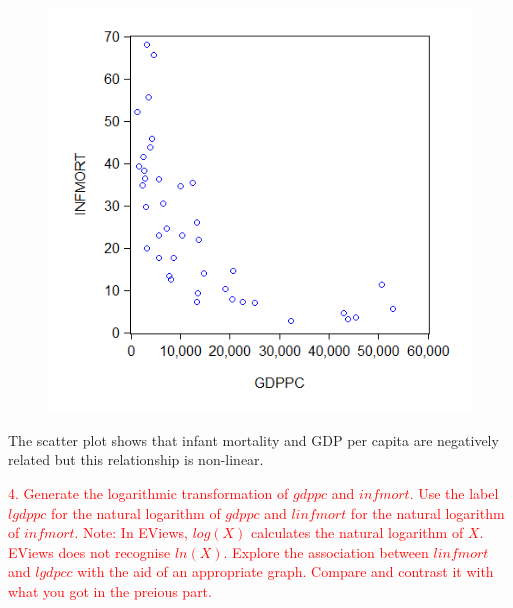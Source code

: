 \documentclass[12pt]{report}
\begin{document}
\vspace{-\baselineskip}	
\begin{figure}[H]
	\centerline{\includegraphics{2018sem2_q1_7}}
\end{figure}
\vspace{-\baselineskip}	\noindent The scatter plot shows that infant mortality and GDP per capita are negatively related but this relationship is non-linear.

\noindent \textcolor{red}{4. Generate the logarithmic transformation of $gdppc$ and $infmort$. Use the label $lgdppc$ for the natural logarithm of $gdppc$ and $linfmort$ for the natural logarithm of $infmort$. Note: In EViews, $log(X)$ calculates the natural logarithm of $X$. EViews does not recognise $ln(X)$. Explore the association between $linfmort$ and $lgdpcc$ with the aid of an appropriate graph. Compare and contrast it with what you got in the preious part.}
\end{document}
